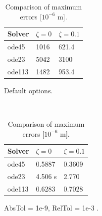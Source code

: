 \documentclass{article}
\begin{document}
	\begin{table}[h]
		\def\arraystretch{1.2}
		\begin{subtable}[t]{0.45\textwidth}
			\centering
			\begin{tabular}{|l|l|l|}
				\hline
				Solver & $\zeta = 0$ & $\zeta = 0.1$\\
				\hline
				ode45  & 1016 & 621.4 \\
				ode23  & 5042 & 3100 \\
				ode113 & 1482 & 953.4 \\
				\hline
			\end{tabular}
			\caption{Default options.}
		\end{subtable}
		~
		\begin{subtable}[t]{0.45\textwidth}
			\centering
			\begin{tabular}{|l|l|l|}
				\hline
				Solver & $\zeta = 0$ & $\zeta = 0.1$\\
				\hline
				ode45  & 0.5887 & 0.3609 \\
				ode23  & 4.506 s & 2.770 \\
				ode113 & 0.6283 & 0.7028 \\
				\hline
			\end{tabular}
			\caption{AbsTol = 1e-9, RelTol = 1e-3 .}
		\end{subtable}
		\caption{Comparison of maximum errors [$10^{-6}$ m].}
		\label{tab:error_comparison}
	\end{table}
	
\end{document}
